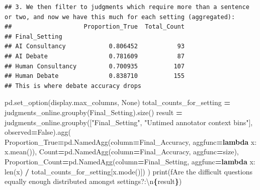 \documentclass[
]{article}
\newenvironment{Shaded}{\begin{snugshade}}{\end{snugshade}}
\newcommand{\BuiltInTok}[1]{#1}
\newcommand{\CharTok}[1]{\textcolor[rgb]{0.31,0.60,0.02}{#1}}
\newcommand{\KeywordTok}[1]{\textcolor[rgb]{0.13,0.29,0.53}{\textbf{#1}}}
\newcommand{\NormalTok}[1]{#1}
\newcommand{\OperatorTok}[1]{\textcolor[rgb]{0.81,0.36,0.00}{\textbf{#1}}}
\newcommand{\SpecialCharTok}[1]{\textcolor[rgb]{0.81,0.36,0.00}{\textbf{#1}}}
\newcommand{\SpecialStringTok}[1]{\textcolor[rgb]{0.31,0.60,0.02}{#1}}
\newcommand{\StringTok}[1]{\textcolor[rgb]{0.31,0.60,0.02}{#1}}
\newcommand{\VariableTok}[1]{\textcolor[rgb]{0.00,0.00,0.00}{#1}}
\begin{document}
\begin{verbatim}
## 3. We then filter to judgments which require more than a sentence or two, and now we have this much for each setting (aggregated):
##                    Proportion_True  Total_Count
## Final_Setting                                  
## AI Consultancy            0.806452           93
## AI Debate                 0.781609           87
## Human Consultancy         0.700935          107
## Human Debate              0.838710          155
## This is where debate accuracy drops
\end{verbatim}

\begin{Shaded}
\begin{Highlighting}[]
\NormalTok{pd.set\_option(}\StringTok{\textquotesingle{}display.max\_columns\textquotesingle{}}\NormalTok{, }\VariableTok{None}\NormalTok{)}
\NormalTok{total\_counts\_for\_setting }\OperatorTok{=}\NormalTok{ judgments\_online.groupby(}\StringTok{\textquotesingle{}Final\_Setting\textquotesingle{}}\NormalTok{).size()}
\NormalTok{result }\OperatorTok{=}\NormalTok{ judgments\_online.groupby([}\StringTok{"Final\_Setting"}\NormalTok{, }\StringTok{"Untimed annotator context bins"}\NormalTok{], observed}\OperatorTok{=}\VariableTok{False}\NormalTok{).agg(}
\NormalTok{    Proportion\_True}\OperatorTok{=}\NormalTok{pd.NamedAgg(column}\OperatorTok{=}\StringTok{\textquotesingle{}Final\_Accuracy\textquotesingle{}}\NormalTok{, aggfunc}\OperatorTok{=}\KeywordTok{lambda}\NormalTok{ x: x.mean()),}
\NormalTok{    Count}\OperatorTok{=}\NormalTok{pd.NamedAgg(column}\OperatorTok{=}\StringTok{\textquotesingle{}Final\_Accuracy\textquotesingle{}}\NormalTok{, aggfunc}\OperatorTok{=}\StringTok{\textquotesingle{}size\textquotesingle{}}\NormalTok{),}
\NormalTok{    Proportion\_Count}\OperatorTok{=}\NormalTok{pd.NamedAgg(column}\OperatorTok{=}\StringTok{\textquotesingle{}Final\_Setting\textquotesingle{}}\NormalTok{, aggfunc}\OperatorTok{=}\KeywordTok{lambda}\NormalTok{ x: }\BuiltInTok{len}\NormalTok{(x) }\OperatorTok{/}\NormalTok{ total\_counts\_for\_setting[x.mode()])}
\NormalTok{)}
\BuiltInTok{print}\NormalTok{(}\SpecialStringTok{f\textquotesingle{}Are the difficult questions equally enough distributed amongst settings?:}\CharTok{\textbackslash{}n}\SpecialCharTok{\{}\NormalTok{result}\SpecialCharTok{\}}\SpecialStringTok{\textquotesingle{}}\NormalTok{)}
\end{Highlighting}
\end{Shaded}
\end{document}
